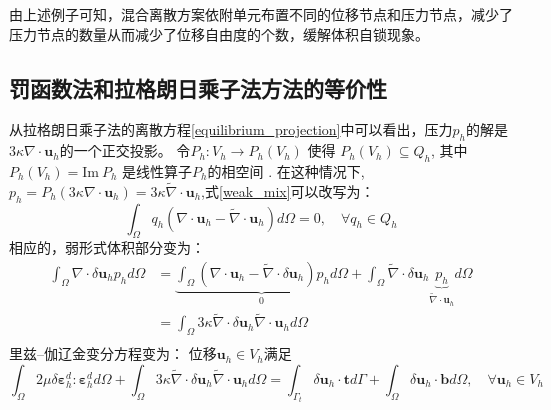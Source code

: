 由上述例子可知，混合离散方案依附单元布置不同的位移节点和压力节点，减少了压力节点的数量从而减少了位移自由度的个数，缓解体积自锁现象。
\subsection{罚函数法和拉格朗日乘子法方法的等价性}
从拉格朗日乘子法的离散方程\eqref{equilibrium_projection}中可以看出，压力$p_h$的解是$3\kappa \nabla \cdot \boldsymbol u_h$的一个正交投影。
令$P_h: V_h \rightarrow P_h(V_h)$ 使得 $P_h(V_h) \subseteq Q_h$, 其中 $P_h(V_h) = \textrm{Im}\:P_h$ 是线性算子$P_h$的相空间 \cite{philippeg.2013}. 
在这种情况下, $p_h = P_h (3\kappa \nabla \cdot \boldsymbol u_h) = 3\kappa \tilde \nabla \cdot \boldsymbol u_h$,式\eqref{weak_mix}可以改写为：
\begin{equation}
    \int_\Omega q_h(\nabla \cdot \boldsymbol u_h - \tilde \nabla \cdot \boldsymbol u_h) d\Omega = 0, \quad \forall q_h \in Q_h
\end{equation}
相应的，弱形式体积部分变为：
\begin{equation}\label{projection_mixed}
    \begin{split}
        \int_\Omega \nabla \cdot \delta \boldsymbol u_h p_h d\Omega &= \underbrace{\int_\Omega (\nabla \cdot \boldsymbol u_h - \tilde \nabla \cdot \delta \boldsymbol u_h) p_h d\Omega}_0 + \int_\Omega \tilde \nabla \cdot \delta \boldsymbol u_h \underbrace{p_h}_{\tilde \nabla \cdot \boldsymbol u_h} d\Omega \\
        &= \int_\Omega 3\kappa \tilde \nabla \cdot \delta \boldsymbol u_h \tilde \nabla \cdot \boldsymbol u_h d\Omega \\
    \end{split}
\end{equation}
里兹--伽辽金变分方程变为：
位移$\boldsymbol u_h \in V_h$满足
\begin{equation}
    \int_\Omega 2\mu \delta \boldsymbol \varepsilon^d_h : \boldsymbol \varepsilon^d_h d\Omega +
    \int_\Omega 3\kappa \tilde \nabla \cdot \delta \boldsymbol u_h \tilde \nabla \cdot \boldsymbol u_h d\Omega =
    \int_{\Gamma_t} \delta \boldsymbol u_h \cdot \boldsymbol t d\Gamma + \int_\Omega \delta \boldsymbol u_h \cdot \boldsymbol b d\Omega, \quad \forall \boldsymbol u_h \in V_h
\end{equation}

